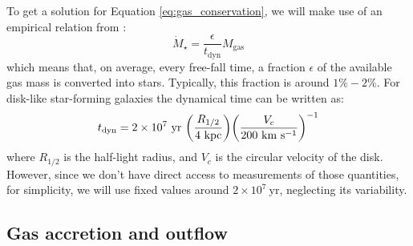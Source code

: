 \documentclass[fleqn, usenatbib]{mnras}
\begin{document}
To get a solution for Equation \ref{eq:gas_conservation}, we will make use of an empirical relation from \citet{Kennicutt1997}:
\begin{equation} \label{eq:kennicutt}
	\dot{M}_{\star} = \frac{\epsilon}{t_{\mathrm{dyn}}} M_{\mathrm{gas}}
\end{equation}
which means that, on average, every free-fall time, a fraction \(\epsilon\) of the available gas mass is converted into stars. Typically, this fraction is around \(1\% - 2\%\). For disk-like star-forming galaxies the dynamical time can be written as:
\begin{equation} \label{eq:t_dyn}
	t_{\mathrm{dyn}} = 2 \times 10^7\ \mathrm{yr}\ \qty(\frac{R_{1/2}}{4\ \mathrm{kpc}}) \qty(\frac{V_c}{200\ \mathrm{km\ s^{-1}}})^{-1}
\end{equation}
where \(R_{1/2}\) is the half-light radius, and \(V_c\) is the circular velocity of the disk. However, since we don't have direct access to measurements of those quantities, for simplicity, we will use fixed values around \(2 \times 10^7\ \mathrm{yr}\), neglecting its variability.

\subsection{Gas accretion and outflow}
\end{document}

